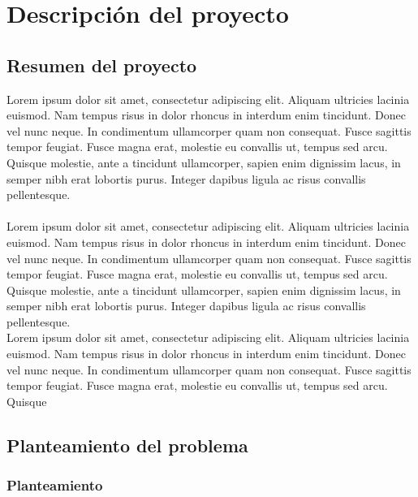 
\chapter{Descripción del proyecto} %

\label{Chapter1} %


\section{Resumen del proyecto}
Lorem ipsum dolor sit amet, consectetur adipiscing elit. Aliquam ultricies lacinia euismod. Nam tempus risus in dolor rhoncus in interdum enim tincidunt. Donec vel nunc neque. In condimentum ullamcorper quam non consequat. Fusce sagittis tempor feugiat. Fusce magna erat, molestie eu convallis ut, tempus sed arcu. Quisque molestie, ante a tincidunt ullamcorper, sapien enim dignissim lacus, in semper nibh erat lobortis purus. Integer dapibus ligula ac risus convallis pellentesque.
\\
\\
Lorem ipsum dolor sit amet, consectetur adipiscing elit. Aliquam ultricies lacinia euismod. Nam tempus risus in dolor rhoncus in interdum enim tincidunt. Donec vel nunc neque. In condimentum ullamcorper quam non consequat. Fusce sagittis tempor feugiat. Fusce magna erat, molestie eu convallis ut, tempus sed arcu. Quisque molestie, ante a tincidunt ullamcorper, sapien enim dignissim lacus, in semper nibh erat lobortis purus. Integer dapibus ligula ac risus convallis pellentesque.
\\
Lorem ipsum dolor sit amet, consectetur adipiscing elit. Aliquam ultricies lacinia euismod. Nam tempus risus in dolor rhoncus in interdum enim tincidunt. Donec vel nunc neque. In condimentum ullamcorper quam non consequat. Fusce sagittis tempor feugiat. Fusce magna erat, molestie eu convallis ut, tempus sed arcu. Quisque
\section{Planteamiento del problema}


\subsection{Planteamiento}

